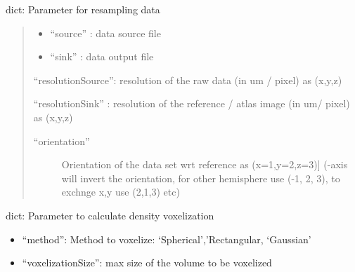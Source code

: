 \documentclass[letterpaper,10pt,english]{sphinxmanual}
\begin{document}
\begin{fulllineitems}
\label{api/ClearMap.Parameter:ClearMap.Parameter.ResamplingParameter}
dict: Parameter for resampling data
\begin{quote}
\begin{itemize}
\item {} 
``source'' : data source file

\item {} 
``sink''   : data output file

\end{itemize}

``resolutionSource'': resolution of the raw data (in um / pixel) as (x,y,z)

``resolutionSink'' : resolution of the reference / atlas image (in um/ pixel) as (x,y,z)
\begin{description}
\item[{``orientation''}] \leavevmode{[}Orientation of the data set wrt reference as (x=1,y=2,z=3){]}
(-axis will invert the orientation, for other hemisphere use (-1, 2, 3), to exchnge x,y use (2,1,3) etc)

\end{description}
\end{quote}




{\hyperref[api/ClearMap.Alignment:module-ClearMap.Alignment.Resampling]{\emph{}}}



\end{fulllineitems}


\begin{fulllineitems}
\label{api/ClearMap.Parameter:ClearMap.Parameter.VoxelizationParameter}
dict: Parameter to calculate density voxelization
\begin{itemize}
\item {} 
``method'': Method to voxelize: `Spherical','Rectangular, `Gaussian'

\item {} 
``voxelizationSize'': max size of the volume to be voxelized

\end{itemize}







\end{fulllineitems}
\end{document}

